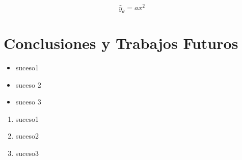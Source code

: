 \documentclass[12pt]{report} %
\begin{document}
\begin{equation}
    \label{eq:ecuacion1}
    \hat{y}_{\theta} = ax^{2}
\end{equation}

\section{Conclusiones y Trabajos Futuros}
\begin{itemize}
    \item suceso1
    \item suceso 2
    \item suceso 3
\end{itemize}

\begin{enumerate}
    \item suceso1
    \item suceso2
    \item suceso3
\end{enumerate}

\printbibliography[title={Bibliografía}]
\end{document}
